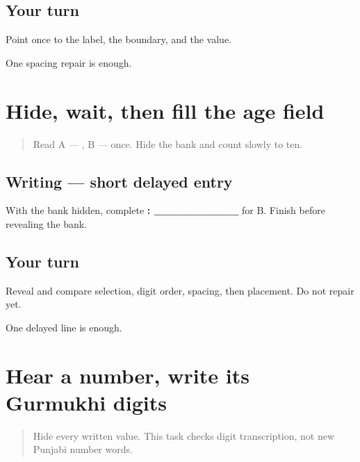 \subsection*{Your turn}
Point once to the label, the boundary, and the value.

\begin{tcolorbox}[breakable,colback=teal!4,colframe=teal!35!black,title={Before you move on}]
One spacing repair is enough.
\end{tcolorbox}
\section[\texorpdfstring{\pa{ਉਮਰ}: \_\_\_\_\_\_\_\_\_\_ (age field after …)}{ਉਮਰ: \_\_\_\_\_\_\_\_\_\_ (age field after …)}]{Hide, wait, then fill the age field}

\label{lesson:PA-W07-age-delayed}



\begin{quote}
Read A — \textbf{}, B — \textbf{} once. Hide the bank and count slowly to ten.
\end{quote}

\subsection*{Writing — short delayed entry}
With the bank hidden, complete \textbf{: \_\_\_\_\_\_\_\_\_\_} for B. Finish before revealing the bank.

\subsection*{Your turn}
Reveal and compare selection, digit order, spacing, then placement. Do not repair yet.

\begin{tcolorbox}[breakable,colback=teal!4,colframe=teal!35!black,title={Before you move on}]
One delayed line is enough.
\end{tcolorbox}
\section[\texorpdfstring{\pa{੧੫} / \pa{੨੫} (15 / 25)}{੧੫ / ੨੫ (15 / 25)}]{Hear a number, write its Gurmukhi digits}

\label{lesson:PA-W07-age-dictation}



\begin{quote}
Hide every written value. This task checks digit transcription, not new Punjabi number words.
\end{quote}

